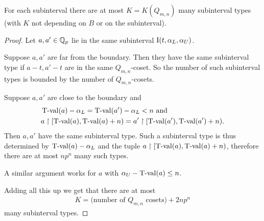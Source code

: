 \begin{Lemma} \label{interval_type_count}
  For each subinterval there are at most $K = K(Q_{m,n})$ many subinterval types 
  (with $K$ not depending on $B$ or on the subinterval).  
\end{Lemma}

\begin{proof}
  Let $a, a' \in \mathbb{Q}_p$ lie in the same subinterval $\operatorname{I}(t, \alpha_L, \alpha_U)$.

  Suppose $a, a'$ are far from the boundary.
  Then they have the same subinterval type if $a - t, a' - t$ are in the same $Q_{m,n}$-coset.
  So the number of such subinterval types is bounded by the number of $Q_{m,n}$-cosets.

  Suppose $a, a'$ are close to the boundary and
  \begin{align*}
    &\operatorname{T-val}(a) - \alpha_L = \operatorname{T-val}(a') - \alpha_L < n \text { and}\\
    &a \upharpoonright [\operatorname{T-val}(a), \operatorname{T-val}(a) + n) = a' \upharpoonright [\operatorname{T-val}(a'), \operatorname{T-val}(a') + n).
  \end{align*}
  Then $a, a'$ have the same subinterval type.
  Such a subinterval type is thus determined by $\operatorname{T-val}(a) - \alpha_L$ and the tuple $a \upharpoonright [\operatorname{T-val}(a), \operatorname{T-val}(a) + n)$,
  therefore there are at most $n p^n$ many such types.

  A similar argument works for $a$ with $\alpha_U - \operatorname{T-val}(a) \leq n$.

  Adding all this up we get that there are at most
  \begin{align*}
    K = \text{(number of $Q_{m,n}$ cosets)} + 2 n p^n  
  \end{align*}
  many subinterval types.
\end{proof}

